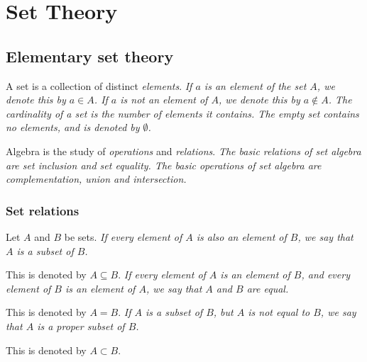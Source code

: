 \chapter{Set Theory}\label{chap:sets}

\section{Elementary set theory}

A set is a collection of distinct \emph{elements}.
\bit
\it If $a$ is an element of the set $A$, we denote this by $a\in A$.
\it If $a$ is \emph{not} an element of $A$, we denote this by $a\notin A$.
\it The \emph{cardinality} of a set is the number of elements it contains.
\it The \emph{empty set} contains no elements, and is denoted by $\emptyset$.
\eit

Algebra is the study of \emph{operations} and \emph{relations}.
\bit
\it The basic relations of set algebra are \emph{set inclusion} and \emph{set equality}.
\it The basic operations of set algebra are \emph{complementation}, \emph{union} and \emph{intersection}.
\eit

\subsection{Set relations}

\begin{definition}
Let $A$ and $B$ be sets. 
\ben
\it If every element of $A$ is also an element of $B$, we say that $A$ is a \emph{subset} of $B$.
\par This is denoted by $A\subseteq B$.
\it If every element of $A$ is an element of $B$, and every element of $B$ is an element of $A$, we say that $A$ and $B$ are \emph{equal}. 
\par This is denoted by $A=B$.
\it If $A$ is a subset of $B$, but $A$ is not equal to $B$, we say that $A$ is a \emph{proper subset} of $B$. 
\par This is denoted by $A\subset B$.
\een
\end{definition}

